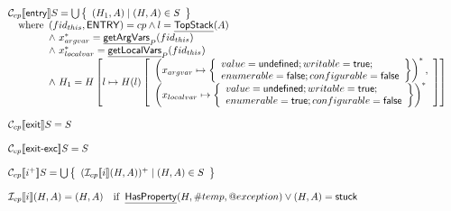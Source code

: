 \documentclass{article}
\makeatletter
\newcommand{\SF}[1]{\mbox{\textsf{#1}}}
\newcommand{\TT}[1]{\mbox{\texttt{#1}}}
\newcommand{\Entry}{\TT{entry}}
\newcommand{\Exit}{\TT{exit}}
\newcommand{\Exite}{\TT{exit-exc}~}
\newcommand{\comment}[1]{\textit{#1}}
\newcommand{\wherec}[1]{{\rm where}\begin{array}[t]{l}#1\end{array}}
\newcommand{\ifc}[1]{{\rm if}\begin{array}[t]{l}#1\end{array}}
\newcommand{\N}{\mathcal{C}}
\newcommand{\I}{\mathcal{I}}
\newcommand{\set}[1]{\left\{\begin{array}{l}#1\end{array}\right\}}
\newcommand{\lbr}{\llbracket}
\newcommand{\rbr}{\rrbracket}
\newcommand{\hf}[1]{\underline{\sf #1}}
\newcommand{\varloc}[1]{\##1}
\newcommand{\varprop}[1]{@#1}
\newcommand{\vtrue}{\SF{true}}
\newcommand{\vfalse}{\SF{false}}
\makeatother
\begin{document}
\[
\begin{array}{l} 
\N _{cp}\lbr {\sf entry} \rbr S = 
 \bigcup\set{(H_1,A) \mid (H,A)\in S} \\
 \quad\wherec{
   ({fid_{this}},\SF{ENTRY}) = cp \land l=\hf{TopStack}(A)\\
   \land\ x_{argvar}^{*} = \hf{getArgVars}_P({fid_{this}}) \\
   \land\ x_{localvar}^{*} = \hf{getLocalVars}_P({fid_{this}}) \\
   \land\ H_1=H\left[l\mapsto
   H(l)
     \left[
       \begin{array}{l}
         \left(x_{argvar}\mapsto\set{value=\SF{undefined};writable=\vtrue;\\
             enumerable=\vfalse;configurable=\vfalse}\right)^{*}, \\
         \left(x_{localvar}\mapsto\set{value=\SF{undefined};writable=\vtrue;\\
             enumerable=\vtrue;configurable=\vfalse}\right)^{*} \\
    \end{array}
     \right]
     \right] \\
}\\\\

\N _{cp}\lbr \SF{exit} \rbr S = S \\\\
\N _{cp}\lbr \SF{exit-exc} \rbr S = S \\\\

\N _{cp}\lbr i^+\rbr S = \bigcup\set{(\I _{cp} \lbr i\rbr(H,A))^{+} \mid (H,A)\in S}\\\\

\I _{cp}\lbr i \rbr (H,A) = (H,A)
\quad\ifc{\hf{HasProperty}(H,\varloc{temp},\varprop{exception}) \lor (H,A)=\SF{stuck}}
\\\\


\end{array}\]
\end{document}
